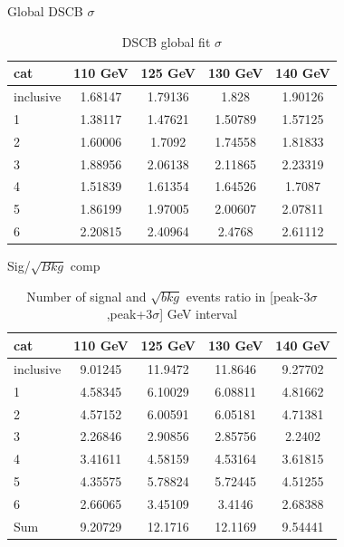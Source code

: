 \documentclass[10pt,UKenglish, leqno, xcolor = dvipsnames]{beamer}
\begin{document}
	\begin{frame}{Global DSCB $\sigma$}
		\vfill
		\centering
		\begin{table}[tbp]
			\centering
			\begin{tabular}{lcccc}
				\toprule[1.5pt]
				cat	& 110 GeV	& 125 GeV	& 130 GeV	& 140 GeV	\\
				\midrule
				inclusive & 1.68147 & 1.79136 & 1.828 & 1.90126 \\ 
				1 & 1.38117 & 1.47621 & 1.50789 & 1.57125 \\ 
				2 & 1.60006 & 1.7092 & 1.74558 & 1.81833 \\
				3 & 1.88956 & 2.06138 & 2.11865 & 2.23319 \\ 
				4 & 1.51839 & 1.61354 & 1.64526 & 1.7087 \\ 
				5 & 1.86199 & 1.97005 & 2.00607 & 2.07811 \\ 
				6 & 2.20815 & 2.40964 & 2.4768 & 2.61112 \\ 
				\bottomrule[1.5pt]
			\end{tabular}
			\caption{DSCB global fit $\sigma$}
		\end{table}
		\vfill
	\end{frame}

	\begin{frame}{Sig/$\sqrt{Bkg}$ comp}
		\vfill
		\begin{table}[tbp]
			\centering
			\begin{tabular}{lcccc}
				\toprule[1.5pt]
				cat & 110 GeV	& 125 GeV	& 130 GeV	& 140 GeV	\\
				\midrule
				inclusive & 9.01245 & 11.9472 & 11.8646 & 9.27702 	\\ 
				1 & 4.58345 & 6.10029 & 6.08811 & 4.81662 	\\
				2 & 4.57152 & 6.00591 & 6.05181 & 4.71381 	\\
				3 & 2.26846 & 2.90856 & 2.85756 & 2.2402 	\\
				4 & 3.41611 & 4.58159 & 4.53164 & 3.61815 	\\
				5 & 4.35575 & 5.78824 & 5.72445 & 4.51255 	\\
				6 & 2.66065 & 3.45109 & 3.4146 & 2.68388 	\\
				Sum & 9.20729 & 12.1716 & 12.1169 & 9.54441	\\
				\bottomrule[1.5pt]
			\end{tabular}
			\caption{Number of signal and $\sqrt{bkg}$ events ratio in [peak-3$\sigma$,peak+3$\sigma$] GeV interval}
		\end{table}
		\vfill
	\end{frame}
\end{document}
